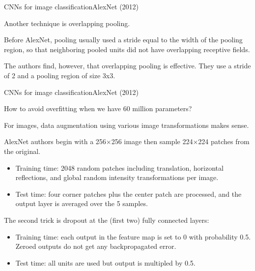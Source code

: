 \documentclass{beamer}
\begin{document}
\begin{frame}{CNNs for image classification}{AlexNet (2012)}

  Another technique is \alert{overlapping pooling}.

  \medskip

  Before AlexNet, pooling usually used a stride equal to the width of
  the pooling region, so that neighboring pooled units did not have
  overlapping receptive fields.

  \medskip
  
  The authors find, however, that overlapping pooling is effective. They
  use a stride of 2 and a pooling region of size 3x3.

\end{frame}


\begin{frame}{CNNs for image classification}{AlexNet (2012)}

  How to avoid overfitting when we have 60 million parameters?

  \medskip

  For images, \alert{data augmentation} using various image
  transformations makes sense.

  \medskip

  AlexNet authors begin with a 256$\times$256 image then sample
  224$\times$224 patches from the original.
  \begin{itemize}
  \item Training time: 2048 random patches including translation,
    horizontal reflections, and global random intensity
    transformations per image.
  \item Test time: four corner patches plus the center patch are
    processed, and the output layer is averaged over the 5 samples.
  \end{itemize}

  \medskip

  The second trick is \alert{dropout} at the (first two) fully
  connected layers:
  \begin{itemize}
  \item Training time: each output in the feature map is set to 0 with
    probability 0.5. Zeroed outputs do not get any backpropagated
    error.
  \item Test time: all units are used but output is multipled by 0.5.
  \end{itemize}
  
\end{frame}
\end{document}
